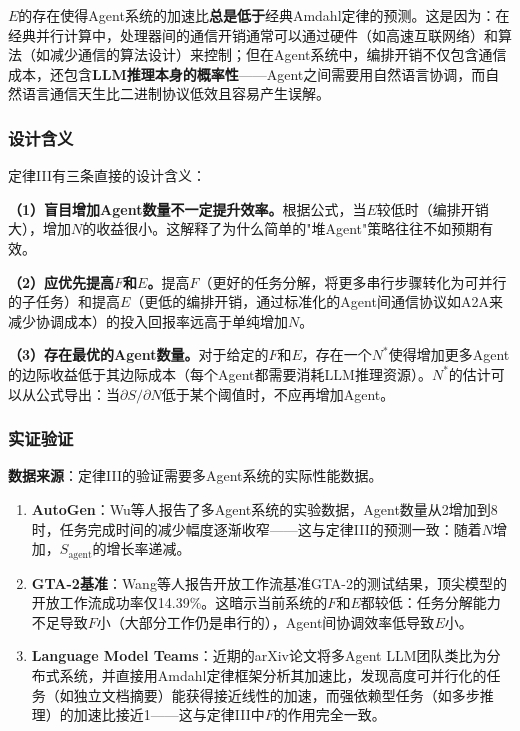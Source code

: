 $E$的存在使得Agent系统的加速比\textbf{总是低于}经典Amdahl定律的预测。这是因为：在经典并行计算中，处理器间的通信开销通常可以通过硬件（如高速互联网络）和算法（如减少通信的算法设计）来控制；但在Agent系统中，编排开销不仅包含通信成本，还包含\textbf{LLM推理本身的概率性}——Agent之间需要用自然语言协调，而自然语言通信天生比二进制协议低效且容易产生误解。

\subsubsection{设计含义}

定律III有三条直接的设计含义：

\textbf{（1）盲目增加Agent数量不一定提升效率。}根据公式，当$E$较低时（编排开销大），增加$N$的收益很小。这解释了为什么简单的"堆Agent"策略往往不如预期有效。

\textbf{（2）应优先提高$F$和$E$。}提高$F$（更好的任务分解，将更多串行步骤转化为可并行的子任务）和提高$E$（更低的编排开销，通过标准化的Agent间通信协议如A2A\cite{agentprotocols2025}来减少协调成本）的投入回报率远高于单纯增加$N$。

\textbf{（3）存在最优的Agent数量。}对于给定的$F$和$E$，存在一个$N^*$使得增加更多Agent的边际收益低于其边际成本（每个Agent都需要消耗LLM推理资源）。$N^*$的估计可以从公式导出：当$\partial S / \partial N$低于某个阈值时，不应再增加Agent。

\subsubsection{实证验证}

\textbf{数据来源}：定律III的验证需要多Agent系统的实际性能数据。

\begin{enumerate}[nosep]
\item \textbf{AutoGen}：Wu等人报告了多Agent系统的实验数据，Agent数量从2增加到8时，任务完成时间的减少幅度逐渐收窄\cite{wu2023autogen}——这与定律III的预测一致：随着$N$增加，$S_{\mathrm{agent}}$的增长率递减。

\item \textbf{GTA-2基准}：Wang等人报告开放工作流基准GTA-2的测试结果，顶尖模型的开放工作流成功率仅14.39\%\cite{gta2_2025}。这暗示当前系统的$F$和$E$都较低：任务分解能力不足导致$F$小（大部分工作仍是串行的），Agent间协调效率低导致$E$小。

\item \textbf{Language Model Teams}：近期的arXiv论文将多Agent LLM团队类比为分布式系统，并直接用Amdahl定律框架分析其加速比\cite{langmodelteams2026}，发现高度可并行化的任务（如独立文档摘要）能获得接近线性的加速，而强依赖型任务（如多步推理）的加速比接近1——这与定律III中$F$的作用完全一致。
\end{enumerate}

